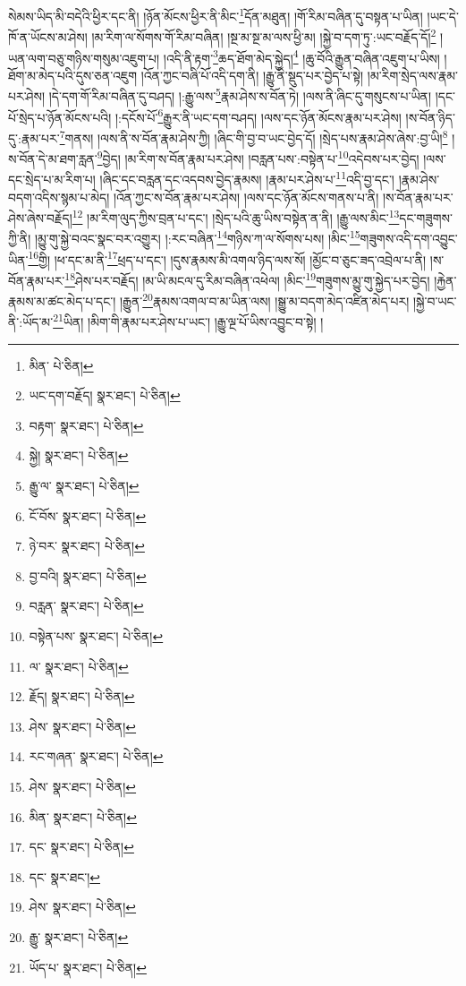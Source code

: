 སེམས་ཡིད་མི་བདེའི་ཕྱིར་དང་ནི། །ཉོན་མོངས་ཕྱིར་ནི་མིང་\footnote{མིན་  པེ་ཅིན། }དོན་མཐུན། །གོ་རིམ་བཞིན་དུ་བསྟན་པ་ཡིན། །ཡང་དེ་ཁོ་ན་ཡོངས་མ་ཤེས། །མ་རིག་ལ་སོགས་གོ་རིམ་བཞིན། །སྔ་མ་སྔ་མ་ལས་ཕྱི་མ། །སྐྱེ་བ་དག་ཏུ་:ཡང་བརྗོད་དོ།\footnote{ཡང་དག་བརྗོད།  སྣར་ཐང་།  པེ་ཅིན། } །ཡན་ལག་བཅུ་གཉིས་གསུམ་འཇུག་པ། །འདི་ནི་རྟག་\footnote{བརྟག་  སྣར་ཐང་།  པེ་ཅིན། }ཆད་ཐོག་མེད་སྐྱེད།\footnote{སྐྱེ།  སྣར་ཐང་།  པེ་ཅིན། } །ཆུ་བོའི་རྒྱུན་བཞིན་འཇུག་པ་ཡིས། །ཐོག་མ་མེད་པའི་དུས་ཅན་འཇུག །འོན་ཀྱང་བཞི་པོ་འདི་དག་ནི། །རྒྱུ་ནི་སྡུད་པར་བྱེད་པ་སྟེ། །མ་རིག་སྲེད་ལས་རྣམ་པར་ཤེས། །དེ་དག་གོ་རིམ་བཞིན་དུ་བཤད། །:རྒྱུ་ལས་\footnote{རྒྱུ་ལ་  སྣར་ཐང་།  པེ་ཅིན། }རྣམ་ཤེས་ས་བོན་ཏེ། །ལས་ནི་ཞིང་དུ་གསུངས་པ་ཡིན། །དང་པོ་སྲེད་པ་ཉོན་མོངས་པའི། །:དངོས་པོ་\footnote{ངོ་བོས་  སྣར་ཐང་།  པེ་ཅིན། }རྒྱུར་ནི་ཡང་དག་བཤད། །ལས་དང་ཉོན་མོངས་རྣམ་པར་ཤེས། །ས་བོན་ཉིད་དུ་:རྣམ་པར་\footnote{ཉེ་བར་  སྣར་ཐང་།  པེ་ཅིན། }གནས། །ལས་ནི་ས་བོན་རྣམ་ཤེས་ཀྱི། །ཞིང་གི་བྱ་བ་ཡང་བྱེད་དོ། །སྲེད་པས་རྣམ་ཤེས་ཞེས་:བྱ་ཡི།\footnote{བྱ་བའི།  སྣར་ཐང་།  པེ་ཅིན། } །ས་བོན་དེ་མ་ཐག་རླན་\footnote{བརླན་  སྣར་ཐང་།  པེ་ཅིན། }བྱེད། །མ་རིག་ས་བོན་རྣམ་པར་ཤེས། །བརླན་པས་:བསྟེན་པ་\footnote{བསྟེན་པས་  སྣར་ཐང་།  པེ་ཅིན། }འདེབས་པར་བྱེད། །ལས་དང་སྲེད་པ་མ་རིག་པ། །ཞིང་དང་བརླན་དང་འདབས་བྱེད་རྣམས། །རྣམ་པར་ཤེས་པ་\footnote{ལ་  སྣར་ཐང་།  པེ་ཅིན། }འདི་བྱ་དང་། །རྣམ་ཤེས་བདག་འདིས་སྙམ་པ་མེད། །འོན་ཀྱང་ས་བོན་རྣམ་པར་ཤེས། །ལས་དང་ཉོན་མོངས་གནས་པ་ནི། །ས་བོན་རྣམ་པར་ཤེས་ཞེས་བརྗོད།\footnote{རྗོད།  སྣར་ཐང་།  པེ་ཅིན། } །མ་རིག་ལུད་ཀྱིས་བྲན་པ་དང་། །སྲེད་པའི་ཆུ་ཡིས་བསྟེན་ན་ནི། །རྒྱུ་ལས་མིང་\footnote{ཤེས་  སྣར་ཐང་།  པེ་ཅིན། }དང་གཟུགས་ཀྱི་ནི། །མྱུ་གུ་སྐྱེ་བའང་སྣང་བར་འགྱུར། །:རང་བཞིན་\footnote{རང་གཞན་  སྣར་ཐང་།  པེ་ཅིན། }གཉིས་ཀ་ལ་སོགས་པས། །མིང་\footnote{ཤེས་  སྣར་ཐང་།  པེ་ཅིན། }གཟུགས་འདི་དག་འབྱུང་ཡིན་\footnote{མིན་  སྣར་ཐང་།  པེ་ཅིན། }གྱི། །ཕ་དང་མ་ནི་\footnote{དང་  སྣར་ཐང་།  པེ་ཅིན། }ཕྲད་པ་དང་། །དུས་རྣམས་མི་འགལ་ཉིད་ལས་སོ། །མྱོང་བ་ཅུང་ཟད་འབྲེལ་པ་ནི། །ས་བོན་རྣམ་པར་\footnote{དང་  སྣར་ཐང་། }ཤེས་པར་བརྗོད། །མ་ཡི་མངལ་དུ་རིམ་བཞིན་འཕེལ། །མིང་\footnote{ཤེས་  སྣར་ཐང་།  པེ་ཅིན། }གཟུགས་མྱུ་གུ་སྐྱེད་པར་བྱེད། །རྐྱེན་རྣམས་མ་ཚང་མེད་པ་དང་། །རྒྱུན་\footnote{རྒྱུ་  སྣར་ཐང་།  པེ་ཅིན། }རྣམས་འགལ་བ་མ་ཡིན་ལས། །སྒྱུ་མ་བདག་མེད་འཛིན་མེད་པར། །སྐྱེ་བ་ཡང་ནི་:ཡོད་མ་\footnote{ཡོད་པ་  སྣར་ཐང་།  པེ་ཅིན། }ཡིན། །མིག་གི་རྣམ་པར་ཤེས་པ་ཡང་། །རྒྱུ་ལྔ་པོ་ཡིས་འབྱུང་བ་སྟེ། །
